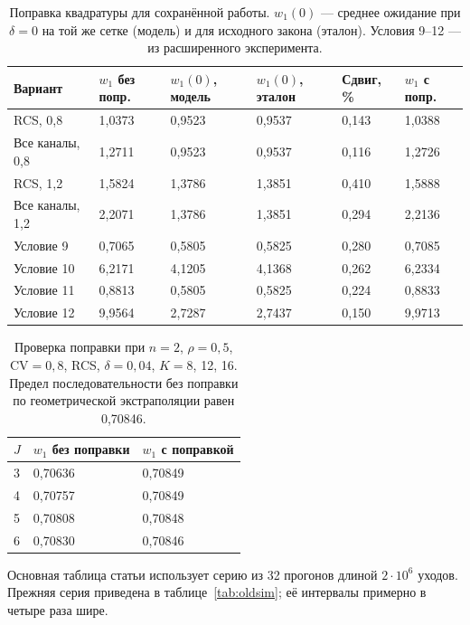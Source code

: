 \documentclass[a4paper,12pt]{article}
\begin{document}
\begin{table}[!htbp]
\centering\small\setlength{\tabcolsep}{2pt}
\begin{tabular}{@{}p{4.4cm}p{2.2cm}p{2.2cm}p{2.2cm}p{1.9cm}p{2.2cm}@{}}
\toprule
Вариант & $w_1$ без попр. & $w_1(0)$, модель & $w_1(0)$, эталон & Сдвиг, \% & $w_1$ с попр. \\
\midrule
RCS, 0,8 & 1,0373 & 0,9523 & 0,9537 & 0,143 & 1,0388 \\
Все каналы, 0,8 & 1,2711 & 0,9523 & 0,9537 & 0,116 & 1,2726 \\
RCS, 1,2 & 1,5824 & 1,3786 & 1,3851 & 0,410 & 1,5888 \\
Все каналы, 1,2 & 2,2071 & 1,3786 & 1,3851 & 0,294 & 2,2136 \\
Условие 9 & 0,7065 & 0,5805 & 0,5825 & 0,280 & 0,7085 \\
Условие 10 & 6,2171 & 4,1205 & 4,1368 & 0,262 & 6,2334 \\
Условие 11 & 0,8813 & 0,5805 & 0,5825 & 0,224 & 0,8833 \\
Условие 12 & 9,9564 & 2,7287 & 2,7437 & 0,150 & 9,9713 \\
\bottomrule
\end{tabular}
\caption{Поправка квадратуры для сохранённой работы. \(w_1(0)\) --- среднее ожидание при \(\delta=0\) на той же сетке (модель) и для исходного закона (эталон). Условия 9--12 --- из расширенного эксперимента.}
\label{tab:correction}
\end{table}

\begin{table}[!htbp]
\centering\small\setlength{\tabcolsep}{2pt}
\begin{tabular}{@{}p{1.5cm}p{4.0cm}p{4.0cm}@{}}
\toprule
$J$ & $w_1$ без поправки & $w_1$ с поправкой \\
\midrule
3 & 0,70636 & 0,70849 \\
4 & 0,70757 & 0,70849 \\
5 & 0,70808 & 0,70848 \\
6 & 0,70830 & 0,70846 \\
\bottomrule
\end{tabular}
\caption{Проверка поправки при \(n=2\), \(\rho=0{,}5\), \(\mathrm{CV}=0{,}8\), RCS, \(\delta=0{,}04\), \(K=8\), 12, 16. Предел последовательности без поправки по геометрической экстраполяции равен 0,70846.}
\label{tab:jseq}
\end{table}

Основная таблица статьи использует серию из 32 прогонов длиной \(2\cdot10^6\) уходов. Прежняя серия приведена в таблице~\ref{tab:oldsim}; её интервалы примерно в четыре раза шире.
\end{document}
